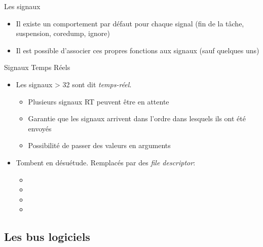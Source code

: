 \begin{frame}[fragile=singleslide]{Les signaux}
\begin{itemize}
\begin{columns}
      \begin{column}{3cm}
        \begin{itemize}
        \item 25: XFSZ
        \item 26: VTALRM
        \item 27: PROF
        \item 28: WINCH
        \item 29: POLL
        \item 30: PWR
        \item 31: SYS
        \end{itemize}
      \end{column}
    \end{columns}
    \vspace{2ex}
  \item Il existe  un comportement par défaut pour  chaque signal (fin
    de la tâche, suspension, coredump, ignore)
  \item Il  est possible d'associer ces propres  fonctions aux signaux
    (sauf quelques uns)
  \end{itemize}
\end{frame}

\begin{frame}[fragile=singleslide]{Signaux Temps Réels}
\begin{itemize}
\item Les signaux > 32 sont dit \emph{temps-réel}.
    \begin{itemize}
    \item Plusieurs signaux RT peuvent être en attente
    \item Garantie que les signaux arrivent dans l'ordre dans lesquels
      ils ont été envoyés
    \item Possibilité de passer des valeurs en arguments
    \end{itemize}
  \item Tombent en désuétude. Remplacés par des \emph{file descriptor}:
    \begin{itemize}
    \item {}
    \item {}
    \item {}
    \item {}
    \end{itemize}
  \end{itemize}
\end{frame}

\subsection{Les bus logiciels}

